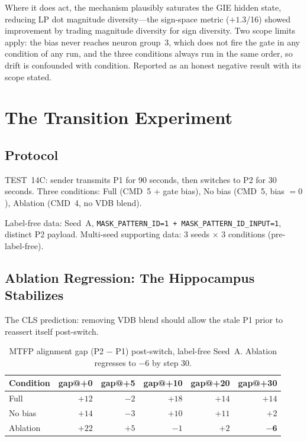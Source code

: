 \documentclass[11pt,letterpaper]{article}
\begin{document}
Where it does act, the mechanism plausibly saturates the GIE hidden state, reducing LP dot magnitude diversity---the sign-space metric ($+1.3$/16) showed improvement by trading magnitude diversity for sign diversity. Two scope limits apply: the bias never reaches neuron group~3, which does not fire the gate in any condition of any run, and the three conditions always run in the same order, so drift is confounded with condition. Reported as an honest negative result with its scope stated.

\section{The Transition Experiment}

\subsection{Protocol}

TEST~14C: sender transmits P1 for 90 seconds, then switches to P2 for 30 seconds. Three conditions: Full (CMD~5 + gate bias), No bias (CMD~5, bias $= 0$), Ablation (CMD~4, no VDB blend).

Label-free data: Seed~A, \texttt{MASK\_PATTERN\_ID=1 + MASK\_PATTERN\_ID\_INPUT=1}, distinct P2 payload. Multi-seed supporting data: 3 seeds $\times$ 3 conditions (pre-label-free).

\subsection{Ablation Regression: The Hippocampus Stabilizes}

The CLS prediction: removing VDB blend should allow the stale P1 prior to reassert itself post-switch.

\begin{table}[h]
\centering
\begin{tabular}{l rrrrr}
\toprule
Condition & gap@+0 & gap@+5 & gap@+10 & gap@+20 & gap@+30 \\
\midrule
Full & $+12$ & $-2$ & $+18$ & $+14$ & $+14$ \\
No bias & $+14$ & $-3$ & $+10$ & $+11$ & $+2$ \\
Ablation & $+22$ & $+5$ & $-1$ & $+2$ & $\mathbf{-6}$ \\
\bottomrule
\end{tabular}
\caption{MTFP alignment gap (P2 $-$ P1) post-switch, label-free Seed~A. Ablation regresses to $-6$ by step 30.}
\end{table}
\end{document}

